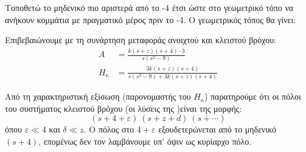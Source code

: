 \documentclass[11pt,a4paper,notitlepage,fleqn]{article}
\begin{document}
\begin{exercise}
\begin{enumgreekparen}
	Τοποθετώ το μηδενικό πιο αριστερά από το -4 έτσι ώστε στο γεωμετρικό τόπο να ανήκουν
	κομμάτια με πραγματικό μέρος πριν το -4. Ο γεωμετρικός τόπος θα γίνει:
	
	Επιβεβαιώνουμε με τη συνάρτηση μεταφοράς ανοιχτού και κλειστού βρόχου:
	\begin{align*}
		A &= \frac{k(s+z)(s+4)\cdot 3}{s(s^2-9)}\\
		H_{\text{κ}} &= \frac{3k(s+z)(s+4)}{s(s^2-9)+3k(s+z)(s+4)}
	\end{align*}
	
	Από τη χαρακτηριστική εξίσωση (παρονομαστής του \( H_{\text{κ}} \))
	παρατηρούμε ότι οι πόλοι του συστήματος κλειστού βρόχου (οι λύσεις της )είναι της μορφής:
	\[
	(s+4+ε)\ (s+z+d)\ (s+\cdots)
	\]
	όπου \( ε\ll 4 \) και \( δ\ll z \). Ο πόλος στο \( 4+ε \) εξουδετερώνεται από το μηδενικό
	\( (s+4) \), επομένως δεν τον λαμβάνουμε υπ' όψιν ως κυρίαρχο πόλο.
\end{enumgreekparen}

\end{exercise}
\end{document}
